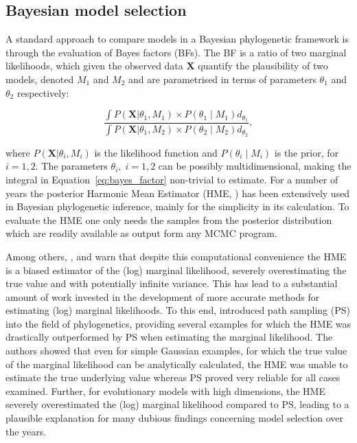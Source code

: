 \subsection{Bayesian model selection\label{sub:model_selection}}

A standard approach to compare models in a Bayesian phylogenetic framework is through the evaluation of Bayes factors (BFs).   
The BF is a ratio of two marginal likelihoods, which given the observed data $\mathbf{X}$ quantify the plausibility of two models, denoted $M_{1}$ and $M_{2}$ and are parametrised in terms of parameters $\theta_{1}$ and $\theta_{2}$ respectively:

% 
\begin{equation}  
\frac{\int P\left(\mathbf{X}|\theta_{1},M_{1}\right)\times P\left(\theta_{1} \mid M_{1}  \right)d_{\theta_{1}}}{\int P\left(\mathbf{X}|\theta_{1},M_{2}\right)\times P\left(\theta_{2} \mid M_{2} \right)d_{\theta_{2}}},
\label{eq:bayes_factor}
\end{equation}  
% 

\noindent
where $P\left(\mathbf{X}|\theta_{i},M_{i}\right)$ is the likelihood function and $P\left(\theta_{i} \mid M_{i} \right)$ is the prior, for $i=1, 2$.
The parameters $\theta_{i},\; i=1, 2$ can be possibly multidimensional, making the integral in Equation~\ref{eq:bayes_factor} non-trivial to estimate.
For a number of years the posterior Harmonic Mean Estimator (HME, \cite{Newton1994}) has been extensively used in Bayesian phylogenetic inference, mainly for the simplicity in its calculation. 
To evaluate the HME one only needs the samples from the posterior distribution which are readily available as output form any MCMC program.

Among others, \cite{Meng1996}, \cite{Lartillot2006} and \cite{Xie2011} warn that despite this computational convenience the HME is a biased estimator of the (log) marginal likelihood, severely overestimating the true value and with potentially infinite variance.
This has lead to a substantial amount of work invested in the development of more accurate methods for estimating (log) marginal likelihoods.
To this end, \cite{Lartillot2006} introduced path sampling (PS) into the field of phylogenetics, providing several examples for which the HME was drastically outperformed by PS when estimating the marginal likelihood.
The authors showed that even for simple Gaussian examples, for which the true value of the marginal likelihood can be analytically calculated, the HME was unable to estimate the true underlying value whereas PS proved very reliable for all cases examined. 
Further, for evolutionary models with high dimensions, the HME severely overestimated the (log) marginal likelihood compared to PS, leading to a plausible explanation for many dubious findings concerning model selection over the years.


